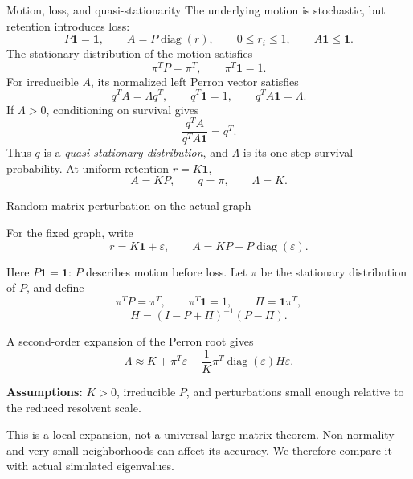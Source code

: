 \begin{frame}{Motion, loss, and quasi-stationarity}
\small
The underlying motion is stochastic, but retention introduces loss:
\[
 P\mathbf{1}=\mathbf{1},\qquad
 A=P\operatorname{diag}(r),\qquad
 0\le r_i\le1,\qquad A\mathbf{1}\le\mathbf{1}.
\]
The stationary distribution of the motion satisfies
\[
 \pi^TP=\pi^T,\qquad \pi^T\mathbf{1}=1.
\]
For irreducible $A$, its normalized left Perron vector satisfies
\[
 q^TA=\Lambda q^T,\qquad q^T\mathbf{1}=1,
 \qquad \boxed{q^TA\mathbf{1}=\Lambda}.
\]
If $\Lambda>0$, conditioning on survival gives
\[
 \frac{q^TA}{q^TA\mathbf{1}}=q^T.
\]
Thus $q$ is a \emph{quasi-stationary distribution}, and $\Lambda$
is its one-step survival probability. At uniform retention $r=K\mathbf{1}$,
\[
 A=KP,\qquad q=\pi,\qquad \Lambda=K.
\]
\end{frame}



\begin{frame}{Random-matrix perturbation on the actual graph}
\small

For the fixed graph, write
\[
    r=K\mathbf{1}+\varepsilon,
    \qquad
    A=KP+P\operatorname{diag}(\varepsilon).
\]

Here $P\mathbf{1}=\mathbf{1}$: $P$ describes motion before loss.
Let $\pi$ be the stationary distribution of $P$, and define
\[
    \pi^TP=\pi^T,
    \qquad
    \pi^T\mathbf{1}=1,
    \qquad
    \Pi=\mathbf{1}\pi^T,
\]
\[
    H=(I-P+\Pi)^{-1}(P-\Pi).
\]

A second-order expansion of the Perron root gives
\[
    \boxed{
    \Lambda\approx
    K+\pi^T\varepsilon+
    \frac{1}{K}
    \pi^T\operatorname{diag}(\varepsilon)H\varepsilon.
    }
\]

\textbf{Assumptions:}
$K>0$, irreducible $P$, and perturbations small enough
relative to the reduced resolvent scale.

\medskip

{\footnotesize
This is a local expansion, not a universal large-matrix theorem.
Non-normality and very small neighborhoods can affect its accuracy.
We therefore compare it with actual simulated eigenvalues.
}
\end{frame}



